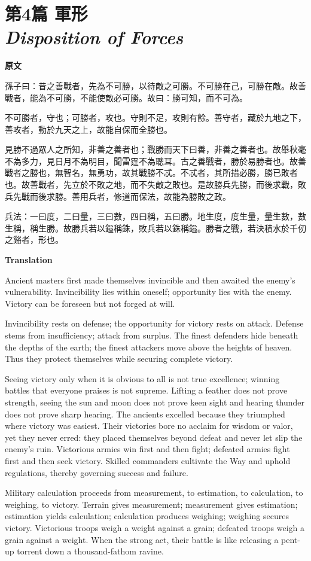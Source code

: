 \documentclass[12pt]{book}
\newcommand{\chapterentry}[4]{%
  \chapter[\texorpdfstring{#1}{#1}]{\texorpdfstring{#1\\\Large\textit{#2}}{#1 — #2}}%
  \noindent\textbf{原文}\par
  #3

  \bigskip
  \noindent\textbf{Translation}\par
  #4
}
\begin{document}
\chapterentry{第4篇 軍形}{Disposition of Forces}{%
孫子曰：昔之善戰者，先為不可勝，以待敵之可勝。不可勝在己，可勝在敵。故善戰者，能為不可勝，不能使敵必可勝。故曰：勝可知，而不可為。

不可勝者，守也；可勝者，攻也。守則不足，攻則有餘。善守者，藏於九地之下，善攻者，動於九天之上，故能自保而全勝也。

見勝不過眾人之所知，非善之善者也；戰勝而天下曰善，非善之善者也。故舉秋毫不為多力，見日月不為明目，聞雷霆不為聰耳。古之善戰者，勝於易勝者也。故善戰者之勝也，無智名，無勇功，故其戰勝不忒。不忒者，其所措必勝，勝已敗者也。故善戰者，先立於不敗之地，而不失敵之敗也。是故勝兵先勝，而後求戰，敗兵先戰而後求勝。善用兵者，修道而保法，故能為勝敗之政。

兵法：一曰度，二曰量，三曰數，四曰稱，五曰勝。地生度，度生量，量生數，數生稱，稱生勝。故勝兵若以鎰稱銖，敗兵若以銖稱鎰。勝者之戰，若決積水於千仞之谿者，形也。}{%
Ancient masters first made themselves invincible and then awaited the enemy’s vulnerability. Invincibility lies within oneself; opportunity lies with the enemy. Victory can be foreseen but not forged at will.

Invincibility rests on defense; the opportunity for victory rests on attack. Defense stems from insufficiency; attack from surplus. The finest defenders hide beneath the depths of the earth; the finest attackers move above the heights of heaven. Thus they protect themselves while securing complete victory.

Seeing victory only when it is obvious to all is not true excellence; winning battles that everyone praises is not supreme. Lifting a feather does not prove strength, seeing the sun and moon does not prove keen sight and hearing thunder does not prove sharp hearing. The ancients excelled because they triumphed where victory was easiest. Their victories bore no acclaim for wisdom or valor, yet they never erred: they placed themselves beyond defeat and never let slip the enemy’s ruin. Victorious armies win first and then fight; defeated armies fight first and then seek victory. Skilled commanders cultivate the Way and uphold regulations, thereby governing success and failure.

Military calculation proceeds from measurement, to estimation, to calculation, to weighing, to victory. Terrain gives measurement; measurement gives estimation; estimation yields calculation; calculation produces weighing; weighing secures victory. Victorious troops weigh a weight against a grain; defeated troops weigh a grain against a weight. When the strong act, their battle is like releasing a pent-up torrent down a thousand-fathom ravine.}
\end{document}
